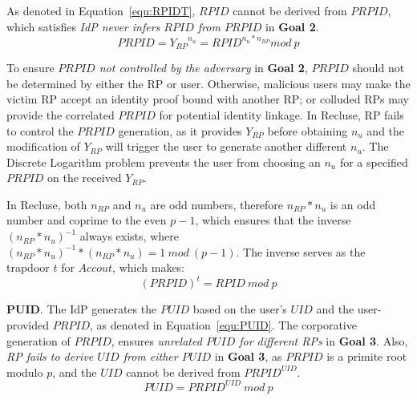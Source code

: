 As denoted in Equation~\ref{equ:RPIDT}, ${RPID}$ cannot be derived from $PRPID$, which satisfies \emph{IdP never infers ${RPID}$ from $PRPID$} in \textbf{Goal 2}.
   \begin{equation}
   PRPID = {Y_{RP}}^{n_{u}} = {RPID}^{n_{u}* n_{RP}} mod \ p
   \label{equ:RPIDT}
   \end{equation}

To ensure \emph{$PRPID$ not controlled by the adversary} in \textbf{Goal 2},
 $PRPID$ should not be determined by  either the RP or user. %
Otherwise, malicious users may make the victim RP accept an identity proof bound with another RP; or colluded RPs may provide the correlated $PRPID$ for potential identity linkage.    
In Recluse, RP fails to control the $PRPID$ generation, as it provides $Y_{RP}$ before obtaining $n_{u}$ and the modification of $Y_{RP}$ will trigger the user to generate another different  $n_{u}$. The Discrete Logarithm problem prevents the user from choosing an $n_{u}$ for a specified $PRPID$ on the received $Y_{RP}$.

In Recluse, both $n_{RP}$ and $n_{u}$ are odd numbers, therefore $n_{RP}*n_{u}$ is an odd number and coprime to the even $p-1$, which ensures that the inverse $(n_{RP}*n_{u})^{-1}$ always exists, where  $(n_{RP}*n_{u})^{-1} * (n_{RP}*n_{u}) = 1 \ mod \ (p-1)$. The inverse  serves as  the trapdoor $t$ for $Accout$, which makes:
\begin{equation}
(PRPID)^t = RPID \ mod \ p
\label{equ:trapdoor}
\end{equation}


\noindent\textbf{PUID}. The IdP generates the $PUID$ based on the user's $UID$ and the user-provided $PRPID$, as denoted in Equation~\ref{equ:PUID}. 
The corporative generation of $PRPID$, ensures \emph{unrelated $PUID$  for different RPs} in \textbf{Goal 3}. Also, \emph{RP fails to derive $UID$ from either $PUID$} in \textbf{Goal 3}, as
   $PRPID$ is a primite root modulo $p$, and the $UID$ cannot be derived from $PRPID^{UID}$. 
\begin{equation}
 PUID = {PRPID}^{UID} \ mod \ p
 \label{equ:PUID}
\end{equation}

